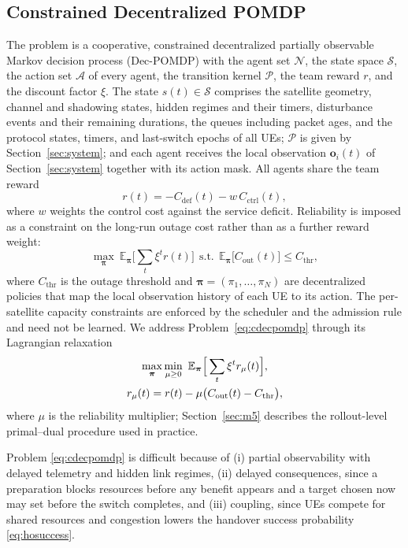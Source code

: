 \documentclass[journal]{IEEEtran}
\newcommand{\Nset}{\mathcal{N}}
\newcommand{\Aset}{\mathcal{A}}
\newcommand{\E}{\mathbb{E}}
\begin{document}
\subsection{Constrained Decentralized POMDP}

The problem is a cooperative, constrained decentralized partially observable
Markov decision process (Dec-POMDP) with the agent set $\Nset$, the state
space $\mathcal{S}$, the action set $\Aset$ of every agent, the transition
kernel $\mathcal{P}$, the team reward $r$, and the discount factor $\xi$. The
state $s(t)\in\mathcal{S}$ comprises the satellite geometry, channel and shadowing states, hidden
regimes and their timers, disturbance events and their remaining durations,
the queues including packet ages, and the protocol states, timers, and
last-switch epochs of all UEs; $\mathcal{P}$ is given by Section~\ref{sec:system}; and
each agent receives the local observation $\mathbf{o}_i(t)$ of
Section~\ref{sec:system} together with its action mask. All agents share the team
reward
\begin{equation}
r(t) = -C_{\mathrm{def}}(t) - w\,C_{\mathrm{ctrl}}(t),
\label{eq:reward}
\end{equation}
where $w$ weights the control cost against the service deficit. Reliability
is imposed as a constraint on the long-run outage cost rather than as a
further reward weight:
\begin{equation}
\max_{\boldsymbol\pi}\ \E_{\boldsymbol\pi}\Big[\sum_{t}\xi^t r(t)\Big]
\ \ \text{s.t.}\ \ \E_{\boldsymbol\pi}\big[C_{\mathrm{out}}(t)\big]\le C_{\mathrm{thr}},
\label{eq:cdecpomdp}
\end{equation}
where $C_{\mathrm{thr}}$ is the outage threshold and
$\boldsymbol\pi=(\pi_1,\dots,\pi_N)$ are decentralized policies that map the
local observation history of each UE to its action. The per-satellite
capacity constraints are enforced by the scheduler and the admission rule and
need not be learned. We address Problem~\eqref{eq:cdecpomdp} through its Lagrangian relaxation
\begin{gather}
\max_{\boldsymbol\pi}\min_{\mu\ge0}\ \E_{\boldsymbol\pi}\Big[\sum_t\xi^t r_\mu(t)\Big],\label{eq:lagrangian}\\
r_\mu(t)=r(t)-\mu\big(C_{\mathrm{out}}(t)-C_{\mathrm{thr}}\big),\notag
\end{gather}
where $\mu$ is the reliability multiplier; Section~\ref{sec:m5} describes the
rollout-level primal--dual procedure used in practice.

Problem \eqref{eq:cdecpomdp} is difficult because of (i) partial
observability with delayed telemetry and hidden link regimes, (ii) delayed
consequences, since a preparation blocks resources before any benefit appears
and a target chosen now may set before the switch completes, and (iii)
coupling, since UEs compete for shared resources and congestion lowers the
handover success probability \eqref{eq:hosuccess}.
\end{document}
